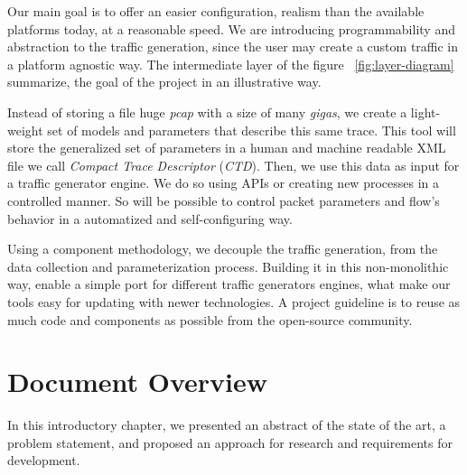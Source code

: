 Our main goal is to offer an easier configuration, realism than the available platforms today, at a reasonable speed. We are introducing programmability and abstraction to the traffic generation, since the user may create a custom traffic in a platform agnostic way. The intermediate layer of the figure ~\ref{fig:layer-diagram} summarize, the goal of the project in an illustrative way.

Instead of storing a file huge \textit{pcap} with a size of many \textit{gigas}, we create a light-weight set of models and parameters that describe this same trace. This tool will store the generalized set of parameters in a human and machine readable XML file we call \textit{Compact Trace Descriptor} (\textit{CTD}). Then, we use this data as input for a traffic generator engine. We do so using APIs or creating new processes in a controlled manner. So will be possible to control packet parameters and flow's behavior in a automatized and self-configuring way.

Using a component methodology, we decouple the traffic generation, from the data collection and parameterization process. Building it in this non-monolithic way,  enable a simple port for different traffic generators engines, what make our tools easy for updating with newer technologies. A project guideline is to reuse as much code and components as possible from the open-source community.




\section{Document Overview}

In this introductory chapter, we presented an abstract of the state of the art, a problem statement, and proposed an approach for research and requirements for development.

